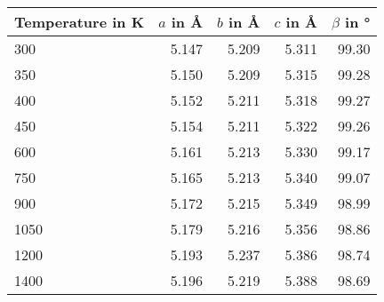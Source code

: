 \begin{tabular}{l|rrrr}
\toprule
    Temperature in K  &  $a$ in \unit{\angstrom}  &  $b$ in \unit{\angstrom}  &  $c$ in \unit{\angstrom}  &  $\beta$ in \unit{\degree} \\ 
\midrule
           \num{300}  &           \num{5.147}  &           \num{5.209}  &           \num{5.311}  &           \num{99.30} \\ 
           \num{350}  &           \num{5.150}  &           \num{5.209}  &           \num{5.315}  &           \num{99.28} \\ 
           \num{400}  &           \num{5.152}  &           \num{5.211}  &           \num{5.318}  &           \num{99.27} \\ 
           \num{450}  &           \num{5.154}  &           \num{5.211}  &           \num{5.322}  &           \num{99.26} \\ 
           \num{600}  &           \num{5.161}  &           \num{5.213}  &           \num{5.330}  &           \num{99.17} \\ 
           \num{750}  &           \num{5.165}  &           \num{5.213}  &           \num{5.340}  &           \num{99.07} \\ 
           \num{900}  &           \num{5.172}  &           \num{5.215}  &           \num{5.349}  &           \num{98.99} \\ 
          \num{1050}  &           \num{5.179}  &           \num{5.216}  &           \num{5.356}  &           \num{98.86} \\ 
          \num{1200}  &           \num{5.193}  &           \num{5.237}  &           \num{5.386}  &           \num{98.74} \\ 
          \num{1400}  &           \num{5.196}  &           \num{5.219}  &           \num{5.388}  &           \num{98.69} \\ 
\bottomrule
\end{tabular}
